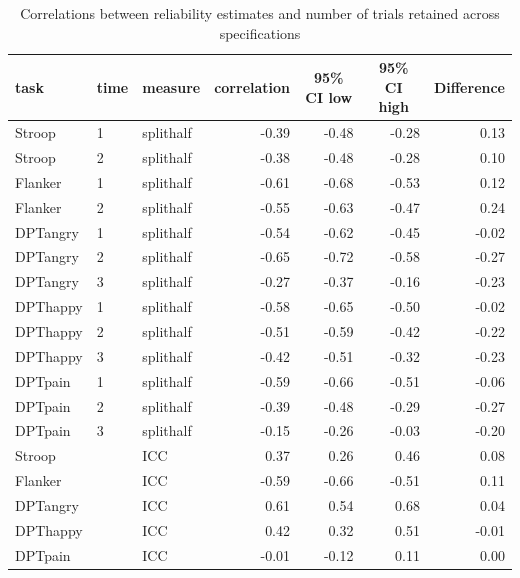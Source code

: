 \documentclass[
  english,
  man,floatsintext]{apa6}
\begin{document}
\begin{table}[tbp]

\begin{center}
\begin{threeparttable}

\caption{\label{tab:tableone}Correlations between reliability estimates and number of trials retained across specifications}

\begin{tabular}{lllrrrr}
\toprule
task & \multicolumn{1}{c}{time} & \multicolumn{1}{c}{measure} & \multicolumn{1}{c}{correlation} & \multicolumn{1}{c}{95\% CI low} & \multicolumn{1}{c}{95\% CI high} & \multicolumn{1}{c}{Difference}\\
\midrule
Stroop & 1 & splithalf & -0.39 & -0.48 & -0.28 & 0.13\\
Stroop & 2 & splithalf & -0.38 & -0.48 & -0.28 & 0.10\\
Flanker & 1 & splithalf & -0.61 & -0.68 & -0.53 & 0.12\\
Flanker & 2 & splithalf & -0.55 & -0.63 & -0.47 & 0.24\\
DPTangry & 1 & splithalf & -0.54 & -0.62 & -0.45 & -0.02\\
DPTangry & 2 & splithalf & -0.65 & -0.72 & -0.58 & -0.27\\
DPTangry & 3 & splithalf & -0.27 & -0.37 & -0.16 & -0.23\\
DPThappy & 1 & splithalf & -0.58 & -0.65 & -0.50 & -0.02\\
DPThappy & 2 & splithalf & -0.51 & -0.59 & -0.42 & -0.22\\
DPThappy & 3 & splithalf & -0.42 & -0.51 & -0.32 & -0.23\\
DPTpain & 1 & splithalf & -0.59 & -0.66 & -0.51 & -0.06\\
DPTpain & 2 & splithalf & -0.39 & -0.48 & -0.29 & -0.27\\
DPTpain & 3 & splithalf & -0.15 & -0.26 & -0.03 & -0.20\\
Stroop &  & ICC & 0.37 & 0.26 & 0.46 & 0.08\\
Flanker &  & ICC & -0.59 & -0.66 & -0.51 & 0.11\\
DPTangry &  & ICC & 0.61 & 0.54 & 0.68 & 0.04\\
DPThappy &  & ICC & 0.42 & 0.32 & 0.51 & -0.01\\
DPTpain &  & ICC & -0.01 & -0.12 & 0.11 & 0.00\\
\bottomrule
\end{tabular}

\end{threeparttable}
\end{center}

\end{table}
\end{document}
